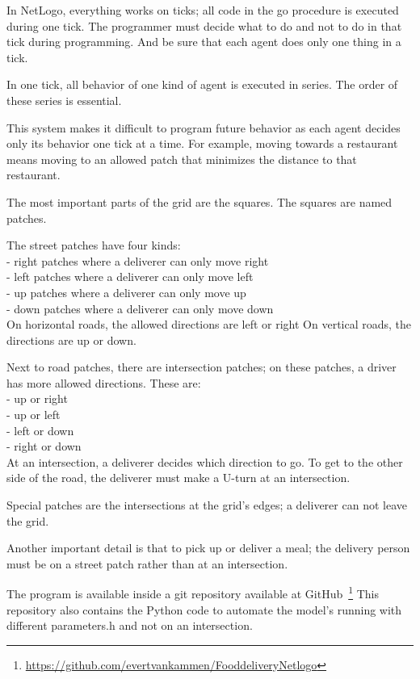In NetLogo, everything works on ticks; all code in the go procedure is executed during one tick.
The programmer must decide what to do and not to do in that tick during programming.
And be sure that each agent does only one thing in a tick.

In one tick, all behavior of one kind of agent is executed in series.
The order of these series is essential.

This system makes it difficult to program future behavior as each agent decides only its behavior one tick at a time.
For example, moving towards a restaurant means moving to an allowed patch that minimizes the distance to that restaurant.

The most important parts of the grid are the squares.
The squares are named patches.

The street patches have four kinds:\\
- right patches where a deliverer can only move right\\
- left patches where a deliverer can only move left\\
- up patches where a deliverer can only move up\\
- down patches where a deliverer can only move down\\

On horizontal roads, the allowed directions are left or right
On vertical roads, the directions are up or down.

Next to road patches, there are intersection patches; on these patches, a driver has more allowed directions.
These are:\\
- up or right\\
- up or left\\
- left or down\\
- right or down\\

At an intersection, a deliverer decides which direction to go.
To get to the other side of the road, the deliverer must make a U-turn at an intersection.

Special patches are the intersections at the grid's edges; a deliverer can not leave the grid.

Another important detail is that to pick up or deliver a meal; the delivery person must be on a street patch rather than at an intersection.

The program is available inside a git repository available at GitHub~\footnote{\url{https://github.com/evertvankammen/FooddeliveryNetlogo}}
This repository also contains the Python code to automate the model's running with different parameters.h and not on an intersection.